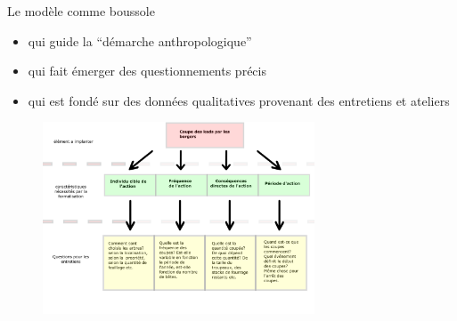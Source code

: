 \documentclass[aspectratio=169]{beamer}
\begin{document}
\begin{frame}{Le modèle  comme boussole}
    \begin{itemize}
        \item qui guide la “démarche anthropologique” 
        \item qui fait émerger des questionnements précis 
        \item qui est fondé sur des données qualitatives provenant des entretiens et ateliers  
    \end{itemize}
    \begin{center}
        \vspace{-1em}
        \begin{figure}
            \centering
            \includegraphics[height = 5.7cm]{img/questionImplementation.png}
        \end{figure}
    \end{center}
\end{frame}
\end{document}
